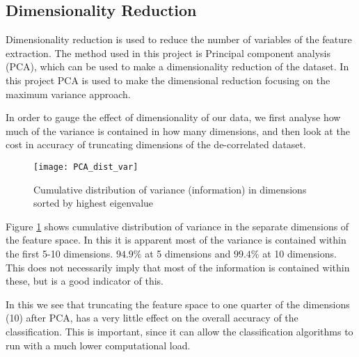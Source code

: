 \subsection*{Dimensionality Reduction}
Dimensionality reduction is used to reduce the number of variables of the feature extraction.
The method used in this project is Principal component analysis (PCA), which can be used to make a dimensionality reduction of the dataset.
In this project PCA is used to make the dimensional reduction focusing on the maximum variance approach.

In order to gauge the effect of dimensionality of our data, we first analyse how much of the variance is contained in how many dimensions, and then look at the cost in accuracy of truncating dimensions of the de-correlated dataset.

\begin{figure}[H]
\centering
\texttt{[image: PCA\_dist\_var]}
\caption{Cumulative distribution of variance (information) in dimensions sorted by highest eigenvalue}
\label{fig:PCA_dist_rap}
\end{figure}

Figure \ref{fig:PCA_dist_rap} shows cumulative distribution of variance in the separate dimensions of the feature space.
In this it is apparent most of the variance is contained within the first 5-10 dimensions. 
$ 94.9 \% $ at 5 dimensions and $ 99.4 \% $ at 10 dimensions.
This does not necessarily imply that most of the information is contained within these, but is a good indicator of this.

In this we see that truncating the feature space to one quarter of the dimensions (10) after PCA, has a very little effect on the overall accuracy of the classification.
This is important, since it can allow the classification algorithms to run with a much lower computational load.
